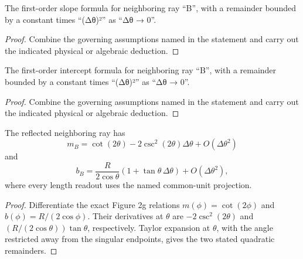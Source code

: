 \begin{theorem}
  \label{decl:physics:IPhO_2026_2_C_2:rayB_slope_firstOrder}
  The first-order slope formula for neighboring ray “B”, with a remainder bounded by a constant times “(Δθ)²” as “Δθ → 0”.
\end{theorem}
\begin{proof}
  Combine the governing assumptions named in the statement and carry out the indicated physical or algebraic deduction.
\end{proof}

\begin{theorem}
  \label{decl:physics:IPhO_2026_2_C_2:rayB_intercept_firstOrder}
  The first-order intercept formula for neighboring ray “B”, with a remainder bounded by a constant times “(Δθ)²” as “Δθ → 0”.
\end{theorem}
\begin{proof}
  Combine the governing assumptions named in the statement and carry out the indicated physical or algebraic deduction.
\end{proof}

\begin{theorem}
\label{thm:physics:IPhO_2026_2_C_2:target}
The reflected neighboring ray has
\[
m_B=\cot(2\theta)-2\csc^2(2\theta)\Delta\theta
  +O(\Delta\theta^2)
\]
and
\[
b_B=\frac{R}{2\cos\theta}
  \left(1+\tan\theta\,\Delta\theta\right)+O(\Delta\theta^2),
\]
where every length readout uses the named common-unit projection.
\end{theorem}
\begin{proof}
Differentiate the exact Figure 2g relations
\(m(\phi)=\cot(2\phi)\) and \(b(\phi)=R/(2\cos\phi)\).
Their derivatives at \(\theta\) are
\(-2\csc^2(2\theta)\) and
\((R/(2\cos\theta))\tan\theta\), respectively.
Taylor expansion at \(\theta\), with the angle restricted away from the
singular endpoints, gives the two stated quadratic remainders.
\end{proof}
